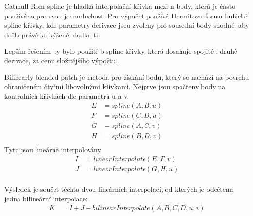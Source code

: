 \documentclass{zcu_sp}
\begin{document}
Catmull-Rom spline je hladká interpolační křivka mezi n body, která je často
používána pro svou jednoduchost. Pro výpočet používá Hermitovu formu kubické spline křivky, kde parametry derivace jsou zvoleny pro sousední body shodné, aby došlo právě ke kýžené hladkosti.

Lepším řešením by bylo použití b-spline křivky, která dosahuje spojité i druhé
derivace, za cenu složitějšího výpočtu.

Bilinearly blended patch je metoda pro získání bodu, který se nachází na povrchu ohraničeném čtyřmi libovolnými křivkami.
Nejprve jsou spočteny body na kontrolních křivkách dle parametrů u a v. 
\begin{align*}
E &= spline(A, B, u) \\
F &= spline(C, D, u) \\
G &= spline(A, C, v) \\
H &= spline(B, D, v) \\
\end{align*}
Tyto jsou lineárně interpolovány
\begin{align*}
I &= linearInterpolate(E, F, v) \\
J &= linearInterpolate(G, H, u) \\
\end{align*}

Výsledek je součet těchto dvou lineárních interpolací, od kterých je odečtena jedna bilineární interpolace:
\begin{align*}
K &= I + J - bilinearInterpolate(A, B, C, D, u, v) \\
\end{align*}
\end{document}
